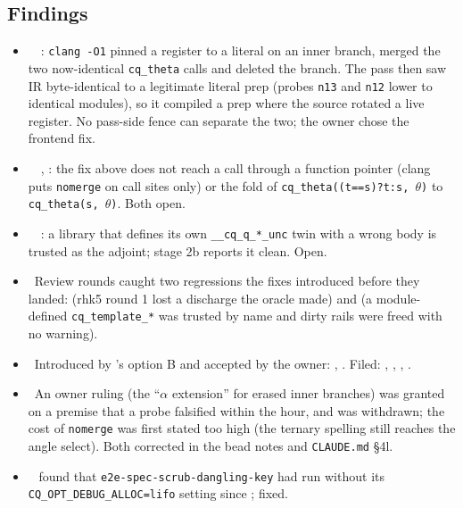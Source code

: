 \subsection*{Findings}
\begin{itemize}
  \item \fconfirmed\ \fpreexisting\ : \texttt{clang -O1} pinned a register
    to a literal on an inner branch, merged the two now-identical
    \texttt{cq\_theta} calls and deleted the branch. The pass then saw IR
    byte-identical to a legitimate literal prep (probes \texttt{n13} and
    \texttt{n12} lower to identical modules), so it compiled a prep where the
    source rotated a live register. No pass-side fence can separate the two;
    the owner chose the frontend fix.
  \item \fconfirmed\ \fpreexisting\ , : the fix above does not
    reach a call through a function pointer (clang puts \texttt{nomerge} on call
    sites only) or the fold of \texttt{cq\_theta((t==s)?t:s, $\theta$)} to
    \texttt{cq\_theta(s, $\theta$)}. Both open.
  \item \fconfirmed\ \fpreexisting\ : a library that defines its own
    \texttt{\_\_cq\_q\_*\_unc} twin with a wrong body is trusted as the adjoint;
    stage 2b reports it clean. Open.
  \item \fconfirmed\ Review rounds caught two regressions the fixes introduced
    before they landed:  (rhk5 round 1 lost a discharge the oracle made)
    and  (a module-defined \texttt{cq\_template\_*} was trusted by name
    and dirty rails were freed with no warning).
  \item \foverdecline\ Introduced by 's option B and accepted by the
    owner: , . Filed: , , ,
    .
  \item \fdoc\ An owner ruling (the ``$\alpha$ extension'' for erased inner
    branches) was granted on a premise that a probe falsified within the hour,
    and was withdrawn; the cost of \texttt{nomerge} was first stated too high
    (the ternary spelling still reaches the angle select). Both corrected in the
    bead notes and \texttt{CLAUDE.md} \S4l.
  \item \fdoc\  found that \texttt{e2e-spec-scrub-dangling-key} had run
    without its \texttt{CQ\_OPT\_DEBUG\_ALLOC=lifo} setting since
    ; fixed.
\end{itemize}

